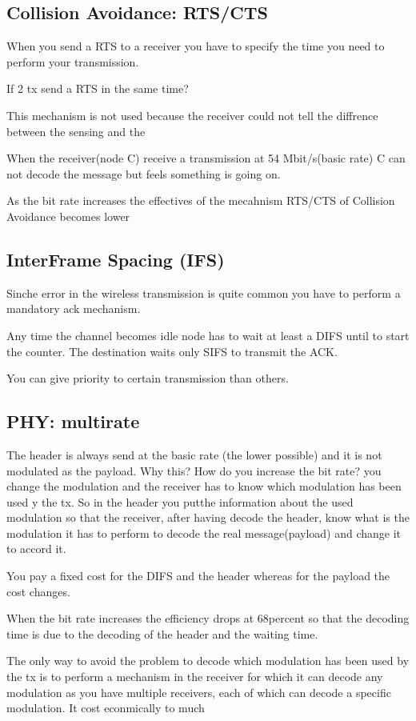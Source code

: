 \subsection{Collision Avoidance: RTS/CTS}

When you send a RTS to a receiver you have to specify the time you need to perform your transmission. 

If 2 tx send a RTS in the same time? 

This mechanism is not used because the receiver could not tell the diffrence between the sensing and the 

When the receiver(node C) receive a transmission at 54 Mbit/s(basic rate) C can not decode the message but feels something is going on. 

As the bit rate increases the effectives of the mecahnism RTS/CTS of Collision Avoidance becomes lower

\subsection{InterFrame Spacing (IFS)}
Sinche error in the wireless transmission is quite common you have to perform a mandatory ack mechanism. 

Any time the channel becomes idle  node has to wait at least a DIFS until to start the counter. The destination waits only  SIFS to transmit the ACK.

You can give priority to certain transmission than others. 

\subsection{PHY: multirate}
The header is always send at the basic rate (the lower possible) and it is not modulated as the payload.
Why this? How do you increase the bit rate? you change the modulation and the receiver has to know which modulation has been used y the tx. So in the header you putthe information about the used modulation so that the receiver, after having decode the header, know what is the modulation it has to perform to decode the real message(payload) and change it to accord it. 

You pay a fixed cost for the DIFS and the header whereas for the payload the cost changes. 

When the bit rate increases the efficiency drops at 68percent so that the decoding time is due to the decoding of the header and the waiting time. 

The only way to avoid the problem to decode which modulation has been used by the tx is to perform a mechanism in the receiver for which it can decode any modulation as you have multiple receivers, each of which can decode a specific modulation.
It cost econmically to much 


